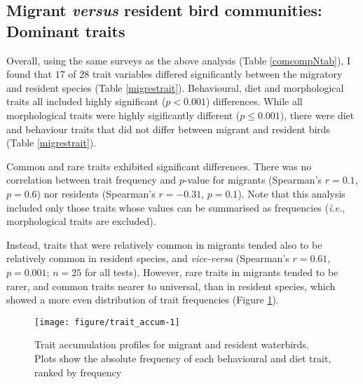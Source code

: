 \clearpage
\subsection{Migrant \emph{versus} resident bird communities: Dominant traits}

Overall, using the same surveys as the above analysis (Table \ref{comcompNtab}), I found that $17$ of $28$ trait variables differed significantly between the migratory and resident species (Table \ref{migrestrait}). Behavioural, diet and morphological traits all included highly significant ($p < 0.001$) differences. While all morphological traits were highly sigificantly different ($p \leq 0.001$), there were diet and behaviour traits that did not differ between migrant and resident birds (Table \ref{migrestrait}). 



Common and rare traits exhibited significant differences. There was no correlation between trait frequency and $p$-value for migrants (Spearman's $r = 0.1$, $p = 0.6$) nor residents (Spearman's $r = \ensuremath{-0.31}$, $p = 0.1$). Note that this analysis included only those traits whose values can be summarised as frequencies (\emph{i.e.}, morphological traits are excluded). 

Instead, traits that were relatively common in migrants tended also to be relatively common in resident species, and \emph{vice-versa} (Spearman's $r = 0.61$, $p = 0.001$; $n=25$ for all tests). However, rare traits in migrants tended to be rarer, and common traits nearer to universal, than in resident species, which showed a more even distribution of trait frequencies (Figure \ref{fig:trait_accum}).

\begin{knitrout}
\color{fgcolor}\begin{figure}[bt]

{\centering \texttt{[image: figure/trait\_accum-1]} 

}

\caption[Trait accumulation profiles for migrant and resident waterbirds]{Trait accumulation profiles for migrant and resident waterbirds. Plots show the absolute frequency of each behavioural and diet trait, ranked by frequency}\label{fig:trait_accum}
\end{figure}


\end{knitrout}

